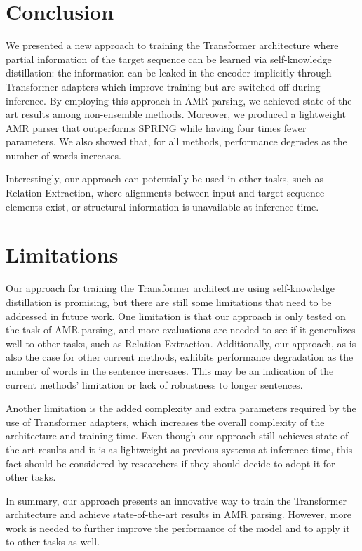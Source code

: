 \documentclass[11pt]{article}
\begin{document}
\section{Conclusion}
We presented a new approach to training the Transformer architecture where partial information of the target sequence can be learned via self-knowledge distillation: the information can be leaked in the encoder implicitly through Transformer adapters which improve training but are switched off during inference.
By employing this approach in AMR parsing, we achieved state-of-the-art results among non-ensemble methods. Moreover, we produced a lightweight AMR parser that outperforms SPRING while having four times fewer parameters.
We also showed that, for all methods, performance degrades as the number of words increases.

Interestingly, our approach can potentially be used in other tasks, such as Relation Extraction, where alignments between input and target sequence elements exist, or structural information is unavailable at inference time.


\section{Limitations}
Our approach for training the Transformer architecture using self-knowledge distillation is promising, but there are still some limitations that need to be addressed in future work. One limitation is that our approach is only tested on the task of AMR parsing, and more evaluations are needed to see if it generalizes well to other tasks, such as Relation Extraction. Additionally, our approach, as is also the case for other current methods, exhibits performance degradation as the number of words in the sentence increases. This may be an indication of the current methods' limitation or lack of robustness to longer sentences.

Another limitation is the added complexity and extra parameters required by the use of Transformer adapters, which increases the overall complexity of the architecture and training time. Even though our approach still achieves state-of-the-art results and it is as lightweight as previous systems at inference time, this fact should be considered by researchers if they should decide to adopt it for other tasks.


In summary, our approach presents an innovative way to train the Transformer architecture and achieve state-of-the-art results in AMR parsing. However, more work is needed to further improve the performance of the model and to apply it to other tasks as well.
\end{document}
